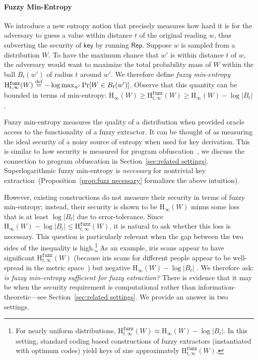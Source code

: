 \documentclass[11pt]{article}
\newcommand{\secref}[1]{\mbox{Section~\ref{#1}}}
\newcommand{\propref}[1]{\mbox{Proposition~\ref{#1}}}
\newcommand{\class}[1]{{\ensuremath{\mathsf{#1}}}}
\newcommand{\key}{\ensuremath{\class{key}}\xspace}
\newcommand{\rep}{\ensuremath{\class{Rep}}\xspace}
\newcommand{\eqdef}{\stackrel{\rm def}{=}}
\newcommand{\Hoo}{\mathrm{H}_\infty}
\newcommand{\Hfuzz}{\mathrm{H}^{\mathtt{fuzz}}_{t,\infty}}
\begin{document}
\paragraph{Fuzzy Min-Entropy}
We introduce a new entropy notion that precisely measures how hard it is for the adversary to guess a value within distance $t$ of the original reading $w$, thus subverting the security of $\key$ by running $\rep$. Suppose $w$ is sampled from a distribution $W$.   To have the maximum chance that $w'$ is within distance $t$ of $w$, the adversary would want to maximize the total probability mass of $W$ within the ball $B_t(w')$ of radius $t$ around $w'$.
We  therefore define \emph{fuzzy min-entropy} $\Hfuzz(W) \eqdef -\log \max_{w'} \Pr[W\in B_t(w')]$.  Observe that this quantity can be bounded in terms of min-entropy: $\Hoo(W) \ge \Hfuzz(W) \ge \Hoo(W)-\log |B_t|$.

Fuzzy min-entropy measures the quality of a distribution when provided oracle access to the functionality of a fuzzy extractor.  It can be thought of as measuring the ideal security of a noisy source of entropy when used for key derivation.  This is similar to how security is measured for program obfuscation~\cite{barak2001possibility}, we discuss the connection to program obfuscation in \secref{sec:related settings}.  Superlogarithmic fuzzy min-entropy is \emph{necessary} for nontrivial key extraction~(\propref{prop:fuzz necessary} formalizes the above intuition).  

However, existing constructions do not measure their security in terms of fuzzy min-entropy; instead, their security is shown to be  $\Hoo(W)$ minus some loss that is at least $\log |B_t|$ due to error-tolerance. Since $\Hoo(W)-\log |B_t| \le \Hfuzz(W)$, it is natural to ask whether this loss is necessary. This question is particularly relevant when the gap between the two sides of the inequality is high.\footnote{For nearly uniform distributions, $\Hfuzz(W) \approx \Hoo(W)- \log |B_t|$.  In this setting, standard coding based constructions of fuzzy extractors (instantiated with optimum codes) yield keys of size approximately $\Hfuzz(W)$.}  As an example, iris scans appear to have significant $\Hfuzz(W)$ (because iris scans for different people appear to be well-spread in the metric space~\cite{daugman2006probing}) but negative $\Hoo(W) -\log |B_t|$ \cite[Section 5]{blanton2009biometric}. We therefore ask: \emph{is fuzzy min-entropy sufficient for fuzzy extraction?} There is evidence that it may be when the security requirement is computational rather than information-theoretic---see \secref{sec:related settings}. We provide an answer in two settings.
\end{document}

